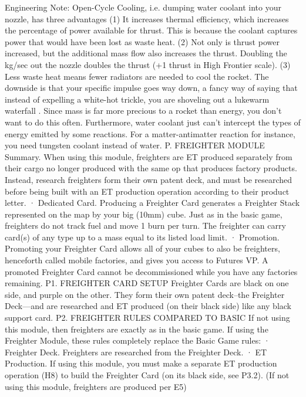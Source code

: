 \documentclass[a4paper]{book}
\begin{document}
Engineering Note: Open-Cycle Cooling, i.e. dumping water coolant into your nozzle, has three advantages (1) It increases thermal efficiency, which increases the percentage of power available for thrust. This is because the coolant captures power that would have been lost as waste heat. (2) Not only is thrust power increased, but the additional mass flow also increases the thrust. Doubling the kg/sec out the nozzle doubles the thrust (+1 thrust in High Frontier scale). (3) Less waste heat means fewer radiators are needed to cool the rocket.  The downside is that your specific impulse goes way down, a fancy way of saying that instead of expelling a white-hot trickle, you are shoveling out a lukewarm waterfall . Since mass is far more precious to a rocket than energy, you don’t want to do this often. Furthermore, water coolant just can’t intercept the types of energy emitted by some reactions. For a matter-antimatter reaction for instance, you need tungsten coolant instead of water.
P. FREIGHTER MODULE
Summary. When using this module, freighters are ET produced separately from their cargo no longer produced with the same op that produces factory products. Instead, research freighters form their own patent deck, and must be researched before being built with an ET production operation according to their product letter.
·       Dedicated Card. Producing a Freighter Card generates a Freighter Stack represented on the map by your big (10mm) cube. Just as in the basic game, freighters do not track fuel and move 1 burn per turn. The freighter can carry card(s) of any type up to a mass equal to its listed load limit.
·       Promotion. Promoting your Freighter Card allows all of your cubes to also be freighters, henceforth called mobile factories, and gives you access to Futures VP. A promoted Freighter Card cannot be decommissioned while you have any factories remaining.
P1. FREIGHTER CARD SETUP
Freighter Cards are black on one side, and purple on the other. They form their own patent deck--the Freighter Deck—and are researched and ET produced (on their black side) like any black support card.
P2. FREIGHTER RULES COMPARED TO BASIC
If not using this module, then freighters are exactly as in the basic game. If using the Freighter Module, these rules completely replace the Basic Game rules:
·       Freighter Deck. Freighters are researched from the Freighter Deck.
·       ET Production. If using this module, you must make a separate ET production operation (H8) to build the Freighter Card (on its black side, see P3.2). (If not using this module, freighters are produced per E5)
\end{document}
